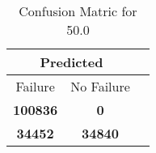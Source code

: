 \begin{table}[] 
\caption{Confusion Matric for 50.0} 
\label{Table: Prediction Accuracy-DMD50.0OnlySunEKF-ignoreReflectionperfectNoFailurePrediction-Reflection} 
\centering 
\begin{tabular} 
 {@{}ccc@{}} 
\toprule 
\multicolumn{2}{c}{\textbf{Predicted}}
 \\ \midrule 
\multicolumn{1}{|c|}{Failure} & 
\multicolumn{1}{c|}{No Failure}
 \\ \midrule 
\multicolumn{1}{|c|}{\color{green}\textbf{100836}} & 
\multicolumn{1}{c|}{\color{red}\textbf{0}}
 \\ \midrule 
\multicolumn{1}{|c|}{\color{red}\textbf{34452}} & 
\multicolumn{1}{c|}{\color{green}\textbf{34840}}
 \\ \bottomrule 
\end{tabular} 
\end{table} 
